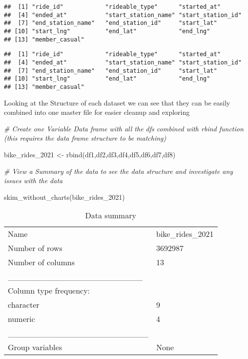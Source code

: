 \documentclass[
]{article}
\newenvironment{Shaded}{\begin{snugshade}}{\end{snugshade}}
\newcommand{\CommentTok}[1]{\textcolor[rgb]{0.56,0.35,0.01}{\textit{#1}}}
\newcommand{\FunctionTok}[1]{\textcolor[rgb]{0.00,0.00,0.00}{#1}}
\newcommand{\NormalTok}[1]{#1}
\newcommand{\OtherTok}[1]{\textcolor[rgb]{0.56,0.35,0.01}{#1}}
\begin{document}
\begin{verbatim}
##  [1] "ride_id"            "rideable_type"      "started_at"        
##  [4] "ended_at"           "start_station_name" "start_station_id"  
##  [7] "end_station_name"   "end_station_id"     "start_lat"         
## [10] "start_lng"          "end_lat"            "end_lng"           
## [13] "member_casual"
\end{verbatim}

\begin{verbatim}
##  [1] "ride_id"            "rideable_type"      "started_at"        
##  [4] "ended_at"           "start_station_name" "start_station_id"  
##  [7] "end_station_name"   "end_station_id"     "start_lat"         
## [10] "start_lng"          "end_lat"            "end_lng"           
## [13] "member_casual"
\end{verbatim}

Looking at the Structure of each dataset we can see that they can be
easily combined into one master file for easier cleanup and exploring

\begin{Shaded}
\begin{Highlighting}[]
\CommentTok{\# Create one Variable Data frame with all the df\textquotesingle{}s combined with rbind function (this requires the data frame structure to be matching)}

\NormalTok{bike\_rides\_2021 }\OtherTok{\textless{}{-}} \FunctionTok{rbind}\NormalTok{(df1,df2,df3,df4,df5,df6,df7,df8)}

\CommentTok{\# View a Summary of the data to see the data structure and investigate any issues with the data}

\FunctionTok{skim\_without\_charts}\NormalTok{(bike\_rides\_2021)}
\end{Highlighting}
\end{Shaded}

\begin{longtable}[]{@{}ll@{}}
\caption{Data summary}\tabularnewline
\toprule
\endhead
Name & bike\_rides\_2021 \\
Number of rows & 3692987 \\
Number of columns & 13 \\
\_\_\_\_\_\_\_\_\_\_\_\_\_\_\_\_\_\_\_\_\_\_\_ & \\
Column type frequency: & \\
character & 9 \\
numeric & 4 \\
\_\_\_\_\_\_\_\_\_\_\_\_\_\_\_\_\_\_\_\_\_\_\_\_ & \\
Group variables & None \\
\bottomrule
\end{longtable}
\end{document}
